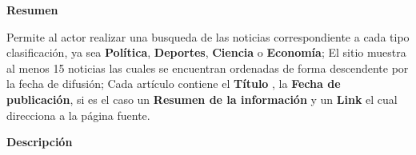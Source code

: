 
\begin{large}
	\textbf{Resumen}\\
\end{large}

Permite al actor realizar una busqueda de las noticias correspondiente a cada tipo clasificación, ya sea \textbf{Política}, \textbf{Deportes}, \textbf{Ciencia} o \textbf{Economía}; El sitio muestra al menos 15 noticias las cuales se encuentran ordenadas de forma descendente por la fecha de difusión; Cada artículo contiene el \textbf{Título} , la \textbf{Fecha de publicación}, si es el caso un \textbf{Resumen de la información}  y un \textbf{Link} el cual direcciona a la página fuente.\\

\begin{large}
\textbf{Descripción}\\
\end{large}

